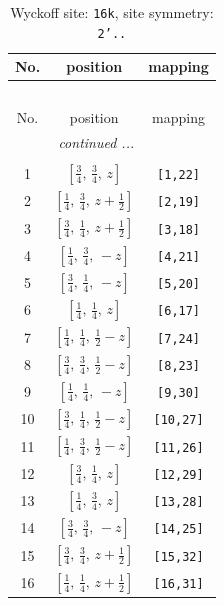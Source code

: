 \documentclass[fleqn,8pt]{jsarticle}
\begin{document}
\begin{longtable}{ccc}
\caption{Wyckoff site: {\tt 16k}, site symmetry: {\tt 2'..}}
 \\
 \hline \hline
No. & position & mapping \\ \hline \endfirsthead

\multicolumn{2}{l}{\tablename\ \thetable{}} \\
 \hline \hline
No. & position & mapping \\ \hline \endhead

 \hline \hline
\multicolumn{2}{r}{\footnotesize\it continued ...} \\ \endfoot

 \hline \hline
\multicolumn{2}{r}{} \\ \endlastfoot

1 & $\left[ \frac{3}{4},\, \frac{3}{4},\, z \right]$ & {\tt [1,22]} \\ \hline
2 & $\left[ \frac{1}{4},\, \frac{3}{4},\, z + \frac{1}{2} \right]$ & {\tt [2,19]} \\ \hline
3 & $\left[ \frac{3}{4},\, \frac{1}{4},\, z + \frac{1}{2} \right]$ & {\tt [3,18]} \\ \hline
4 & $\left[ \frac{1}{4},\, \frac{3}{4},\, - z \right]$ & {\tt [4,21]} \\ \hline
5 & $\left[ \frac{3}{4},\, \frac{1}{4},\, - z \right]$ & {\tt [5,20]} \\ \hline
6 & $\left[ \frac{1}{4},\, \frac{1}{4},\, z \right]$ & {\tt [6,17]} \\ \hline
7 & $\left[ \frac{1}{4},\, \frac{1}{4},\, \frac{1}{2} - z \right]$ & {\tt [7,24]} \\ \hline
8 & $\left[ \frac{3}{4},\, \frac{3}{4},\, \frac{1}{2} - z \right]$ & {\tt [8,23]} \\ \hline
9 & $\left[ \frac{1}{4},\, \frac{1}{4},\, - z \right]$ & {\tt [9,30]} \\ \hline
10 & $\left[ \frac{3}{4},\, \frac{1}{4},\, \frac{1}{2} - z \right]$ & {\tt [10,27]} \\ \hline
11 & $\left[ \frac{1}{4},\, \frac{3}{4},\, \frac{1}{2} - z \right]$ & {\tt [11,26]} \\ \hline
12 & $\left[ \frac{3}{4},\, \frac{1}{4},\, z \right]$ & {\tt [12,29]} \\ \hline
13 & $\left[ \frac{1}{4},\, \frac{3}{4},\, z \right]$ & {\tt [13,28]} \\ \hline
14 & $\left[ \frac{3}{4},\, \frac{3}{4},\, - z \right]$ & {\tt [14,25]} \\ \hline
15 & $\left[ \frac{3}{4},\, \frac{3}{4},\, z + \frac{1}{2} \right]$ & {\tt [15,32]} \\ \hline
16 & $\left[ \frac{1}{4},\, \frac{1}{4},\, z + \frac{1}{2} \right]$ & {\tt [16,31]} \\
\end{longtable}
\end{document}
